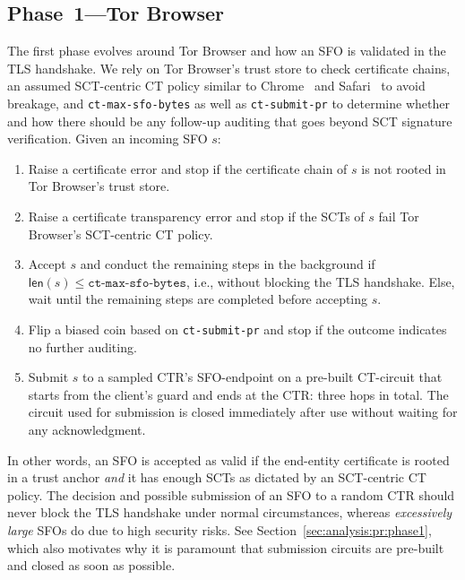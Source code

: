 \subsection{Phase~1---Tor Browser} \label{sec:base:phase1}
The first phase evolves around Tor Browser and how an SFO is validated in the
TLS handshake.  We rely on Tor Browser's trust store to check certificate
chains, an assumed SCT-centric CT policy similar to Chrome~\cite{chrome-policy}
and Safari~\cite{safari-policy} to avoid breakage, and \texttt{ct-max-sfo-bytes}
as well as \texttt{ct-submit-pr} to determine whether and how there should be
any follow-up auditing that goes beyond SCT signature verification.  Given an
incoming SFO $s$:

\begin{enumerate}
	\item Raise a certificate error and stop if the certificate chain of $s$
		is not rooted in Tor Browser's trust store.
	\item Raise a certificate transparency error and stop if the SCTs of $s$
		fail Tor Browser's SCT-centric CT policy.
	\item Accept $s$ and conduct the remaining steps in the background if
		$\mathsf{len}(s) \le \texttt{ct-max-sfo-bytes}$, i.e., without blocking
		the TLS handshake.  Else, wait until the remaining steps are completed
		before accepting $s$.
	\item Flip a biased coin based on \texttt{ct-submit-pr} and stop if the
		outcome indicates no further auditing.
	\item Submit $s$ to a sampled CTR's SFO-endpoint on a pre-built CT-circuit
		that starts from the client's guard and ends at the CTR: three hops in
		total.  The circuit used for submission is closed immediately after
		use without waiting for any acknowledgment.
\end{enumerate}

In other words, an SFO is accepted as valid if the end-entity certificate is
rooted in a trust anchor \emph{and} it has enough SCTs as dictated by an
SCT-centric CT policy.  The decision and possible submission of an SFO to a
random CTR should never block the TLS handshake under normal circumstances,
whereas \emph{excessively large} SFOs do due to high security risks.  See
Section~\ref{sec:analysis:pr:phase1}, which also motivates why it is paramount
that submission circuits are pre-built and closed as soon as possible.

%
%

